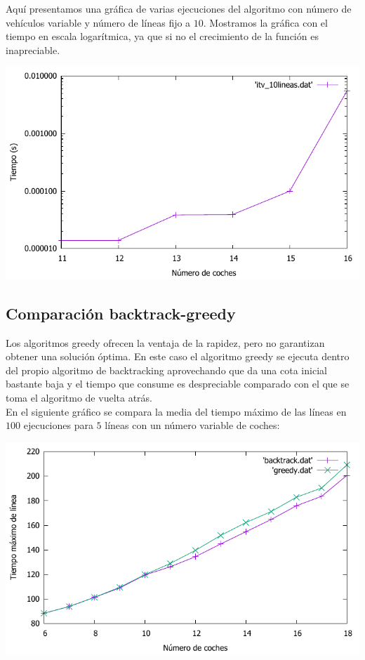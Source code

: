 Aquí presentamos una gráfica de varias ejecuciones del algoritmo con número de vehículos variable y número de líneas fijo a $10$. Mostramos la gráfica con el tiempo en escala logarítmica, ya que si no el crecimiento de la función es inapreciable.

\begin{center}
	\includegraphics[width=\textwidth]{./img/itvEficiencia}
\end{center}

\newpage
\subsection{Comparación backtrack-greedy}

Los algoritmos greedy ofrecen la ventaja de la rapidez, pero no garantizan obtener una solución óptima. En este caso el algoritmo greedy se ejecuta dentro del propio algoritmo de backtracking aprovechando que da una cota inicial bastante baja y el tiempo que consume es despreciable comparado con el que se toma el algoritmo de vuelta atrás. \\

En el siguiente gráfico se compara la media del tiempo máximo de las líneas en $100$ ejecuciones para $5$ líneas con un número variable de coches:

\begin{center}
	\includegraphics[width=\textwidth]{./img/comp}
\end{center}

